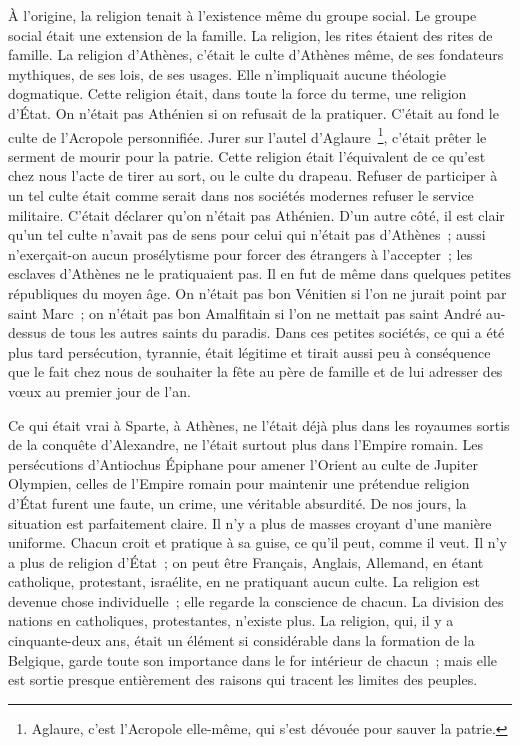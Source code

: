 \documentclass[french,twoside]{book} %
\newcommand\persName[1]{#1}
\newcommand\placeName[1]{#1}
\begin{document}
\noindent À l’origine, la religion tenait à l’existence même du groupe social. Le groupe social était une extension de la famille. La religion, les rites étaient des rites de famille. La religion d’{\placeName Athènes}, c’était le culte d’{\placeName Athènes} même, de ses fondateurs mythiques, de ses lois, de ses usages. Elle n’impliquait aucune théologie dogmatique. Cette religion était, dans toute la force du terme, une religion d’État. On n’était pas Athénien si on refusait de la pratiquer. C’était au fond le culte de l’Acropole personnifiée. Jurer sur l’autel d’{\persName Aglaure} \footnote{{\persName Aglaure}, c’est l’Acropole elle-même, qui s’est dévouée pour sauver la patrie.}, c’était prêter le serment de mourir pour la patrie. Cette religion était l’équivalent de ce qu’est chez nous l’acte de tirer au sort, ou le culte du drapeau. Refuser de participer à un tel culte était comme serait dans nos sociétés modernes refuser le service militaire. C’était déclarer qu’on n’était pas Athénien. D’un autre côté, il est clair qu’un tel culte n’avait pas de sens pour celui qui n’était pas d’{\placeName Athènes} ; aussi n’exerçait-on aucun prosélytisme pour forcer des étrangers à l’accepter ; les esclaves d’{\placeName Athènes} ne le pratiquaient pas. Il en fut de même dans quelques petites républiques du moyen âge. On n’était pas bon Vénitien si l’on ne jurait point par {\persName saint Marc} ; on n’était pas bon Amalfitain si l’on ne mettait pas {\persName saint André} au-dessus de tous les autres saints du paradis. Dans ces petites sociétés, ce qui a été plus tard persécution, tyrannie, était légitime et tirait aussi peu à conséquence que le fait chez nous de souhaiter la fête au père de famille et de lui adresser des vœux au premier jour de l’an.\par
Ce qui était vrai à {\placeName Sparte}, à {\placeName Athènes}, ne l’était déjà plus dans les royaumes sortis de la conquête d’{\persName Alexandre}, ne l’était surtout plus dans l’{\placeName Empire romain}. Les persécutions d’{\persName Antiochus Épiphane} pour amener l’{\placeName Orient} au culte de {\persName Jupiter Olympien}, celles de l’{\placeName Empire romain} pour maintenir une prétendue religion d’État furent une faute, un crime, une véritable absurdité. De nos jours, la situation est parfaitement claire. Il n’y a plus de masses croyant d’une manière uniforme. Chacun croit et pratique à sa guise, ce qu’il peut, comme il veut. Il n’y a plus de religion d’État ; on peut être Français, Anglais, Allemand, en étant catholique, protestant, israélite, en ne pratiquant aucun culte. La religion est devenue chose individuelle ; elle regarde la conscience de chacun. La division des nations en catholiques, protestantes, n’existe plus. La religion, qui, il y a cinquante-deux ans, était un élément si considérable dans la formation de la {\placeName Belgique}, garde toute son importance dans le for intérieur de chacun ; mais elle est sortie presque entièrement des raisons qui tracent les limites des peuples.
\end{document}
